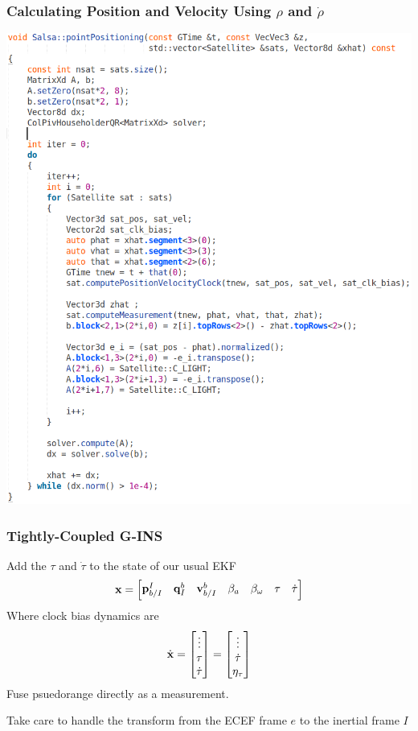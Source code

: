 \documentclass{beamer}
\begin{document}
\begin{frame}\frametitle{Calculating Position and Velocity Using $\rho$ and $\dot{\rho}$}
\includegraphics[height=0.8\textheight]{images/point_positioning_source_code.png}
\end{frame}

\begin{frame}\frametitle{Tightly-Coupled G-INS}
    Add the $\tau$ and $\dot{\tau}$ to the state of our usual EKF
    \begin{equation*}
    	\mathbf{x} = \begin{bmatrix} \mathbf{p}_{b/I}^I & \mathbf{q}_I^b & \mathbf{v}_{b/I}^b  & \beta_a & \beta_{\omega} & \tau & \dot{\tau} \end{bmatrix}
    \end{equation*}
    Where clock bias dynamics are
    \begin{equation*}
    	\dot{\mathbf{x}} = \begin{bmatrix} \vdots \\ \tau \\ \dot{\tau} \end{bmatrix} = \begin{bmatrix} \vdots \\ \dot{\tau} \\ \eta_\tau \end{bmatrix}
    \end{equation*}
    Fuse psuedorange directly as a measurement.

    Take care to handle the transform from the ECEF frame $e$ to the inertial frame $I$
\end{frame}
\end{document}
